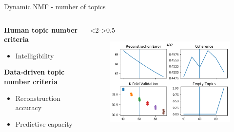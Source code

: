 \documentclass[9pt]{beamer}
\begin{document}
\begin{frame}[t]{Dynamic NMF - number of topics}

\begin{columns}
	\begin{column}{0.5\linewidth}
		\textbf{Human topic number criteria}
		\begin{itemize}
			\item Intelligibility
		\end{itemize}
		\textbf{Data-driven topic number criteria}
		\begin{itemize}
			\item Reconstruction accuracy
			\item Predictive capacity
		\end{itemize}
	\end{column}
	\begin{column}<2->{0.5\linewidth}
		
\begin{figure}
	\includegraphics[width=0.8\linewidth]{../plots/topic_validations_AR2}
	

\end{figure}
\end{column}
\end{columns}
\end{frame}
\end{document}
